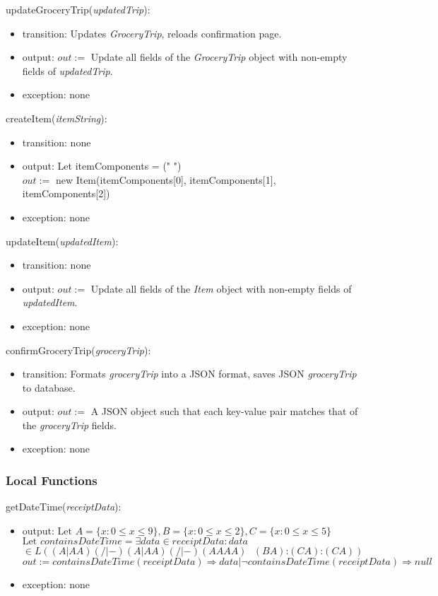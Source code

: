 \documentclass[12pt, titlepage]{article}
\begin{document}
\noindent updateGroceryTrip(\textit{updatedTrip}):
\begin{itemize}
  \item transition: Updates \textit{GroceryTrip}, reloads confirmation page.
  \item output: $out :=$ Update all fields of the \textit{GroceryTrip} object with non-empty fields of \textit{updatedTrip}.
  \item exception: none
\end{itemize}

\noindent createItem(\textit{itemString}):
\begin{itemize}
  \item transition: none
  \item output: Let itemComponents = (" ") \\
                $out :=$ new Item(itemComponents[0], itemComponents[1], itemComponents[2])
  \item exception: none
\end{itemize}

\noindent updateItem(\textit{updatedItem}):
\begin{itemize}
  \item transition: none
  \item output: $out :=$ Update all fields of the \textit{Item} object with non-empty fields of \textit{updatedItem}.
  \item exception: none
\end{itemize}

\noindent confirmGroceryTrip(\textit{groceryTrip}):
\begin{itemize}
  \item transition: Formats \textit{groceryTrip} into a JSON format, saves JSON \textit{groceryTrip} to database.
  \item output: $out := $ A JSON object such that each key-value pair matches that of the \textit{groceryTrip}
                fields.
  \item exception: none
\end{itemize}

\subsubsection{Local Functions}

\noindent getDateTime(\textit{receiptData}):
\begin{itemize}
  \item output: $\text{Let } A=\{x : 0 \leq x \leq 9\}, B=\{x : 0 \leq x \leq 2\}, C=\{x : 0 \leq x \leq 5\}$ \\
                $\text{Let } containsDateTime=\exists data \in receiptData : data$\\ $\in L((A|AA)(/|-)(A|AA)(/|-)(AAAA)\text{ }(BA)\text{:}(CA)\text{:}(CA))$ \\
                $out := containsDateTime(receiptData) \Rightarrow data | \neg containsDateTime(receiptData) \Rightarrow null$
  \item exception: none
\end{itemize}
\end{document}

